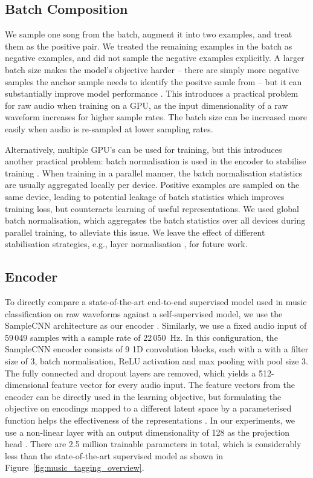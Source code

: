 \documentclass{article}
\begin{document}
\subsection{Batch Composition}
We sample one song from the batch, augment it into two examples, and treat them as the positive pair.
We treated the remaining  examples in the batch as negative examples, and did not sample the negative examples explicitly.
A larger batch size makes the model's objective harder -- there are simply more negative samples the anchor sample needs to identify the positve samle from -- but it can substantially improve model performance \cite{chen_simple_2020}.
This introduces a practical problem for raw audio when training on a GPU, as the input dimensionality of a raw waveform increases for higher sample rates.
The batch size can be increased more easily when audio is re-sampled at lower sampling rates.

Alternatively, multiple GPU's can be used for training, but this introduces another practical problem: batch normalisation is used in the encoder to stabilise training \cite{batch_normalisation} .
When training in a parallel manner, the batch normalisation statistics are usually aggregated locally per device.
Positive examples are sampled on the same device, leading to potential leakage of batch statistics which improves training loss, but counteracts learning of useful representations.
We used global batch normalisation, which aggregates the batch statistics over all devices during parallel training, to alleviate this issue. We leave the effect of different stabilisation strategies, e.g., layer normalisation \cite{henaff2019data}, for future work.

\subsection{Encoder}
To directly compare a state-of-the-art end-to-end supervised model used in music classification on raw waveforms against a self-supervised model, we use the SampleCNN architecture as our encoder \cite{lee2018samplecnn}.
Similarly, we use a fixed audio input of 59\,049 samples with a sample rate of 22\,050~Hz.
In this configuration, the SampleCNN encoder  consists of 9 1D convolution blocks, each with a with a filter size of 3, batch normalisation, ReLU activation and max pooling with pool size 3.
The fully connected and dropout layers are removed, which yields a 512-dimensional feature vector for every audio input.
The feature vectors from the encoder can be directly used in the learning objective, but formulating the objective on encodings mapped to a different latent space by a parameterised function helps the effectiveness of the representations \cite{chen_simple_2020}.
In our experiments, we use a non-linear layer  with an output dimensionality of 128 as the projection head .
There are 2.5 million trainable parameters in total, which is considerably less than the state-of-the-art supervised model as shown in Figure~\ref{fig:music_tagging_overview}.
\end{document}
